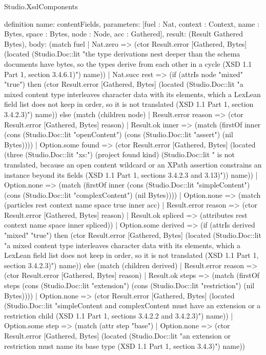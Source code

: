 \begin{lexlean}{Studio.XsdComponents}
\begin{semanticmodule}
definition{
  name: contentFields,
  parameters: [fuel : Nat, context : Context, name : Bytes, space : Bytes, node : Node, acc : Gathered],
  result: (Result Gathered Bytes),
  body: (match fuel
    | Nat.zero => (ctor Result.error [Gathered, Bytes] (located (Studio.Doc::lit "the type derivations nest deeper than the schema documents have bytes, so the types derive from each other in a cycle (XSD 1.1 Part 1, section 3.4.6.1)") name))
    | Nat.succ rest => (if (attrIs node "mixed" "true") then (ctor Result.error [Gathered, Bytes] (located (Studio.Doc::lit "a mixed content type interleaves character data with its elements, which a LexLean field list does not keep in order, so it is not translated (XSD 1.1 Part 1, section 3.4.2.3)") name)) else (match (children node)
      | Result.error reason => (ctor Result.error [Gathered, Bytes] reason)
      | Result.ok inner => (match (firstOf inner (cons (Studio.Doc::lit "openContent") (cons (Studio.Doc::lit "assert") (nil Bytes))))
        | Option.some found => (ctor Result.error [Gathered, Bytes] (located (three (Studio.Doc::lit "xs:") (project found kind) (Studio.Doc::lit " is not translated, because an open content wildcard or an XPath assertion constrains an instance beyond its fields (XSD 1.1 Part 1, sections 3.4.2.3 and 3.13)")) name))
        | Option.none => (match (firstOf inner (cons (Studio.Doc::lit "simpleContent") (cons (Studio.Doc::lit "complexContent") (nil Bytes))))
          | Option.none => (match (particles rest context name space true inner acc)
            | Result.error reason => (ctor Result.error [Gathered, Bytes] reason)
            | Result.ok spliced => (attributes rest context name space inner spliced))
          | Option.some derived => (if (attrIs derived "mixed" "true") then (ctor Result.error [Gathered, Bytes] (located (Studio.Doc::lit "a mixed content type interleaves character data with its elements, which a LexLean field list does not keep in order, so it is not translated (XSD 1.1 Part 1, section 3.4.2.3)") name)) else (match (children derived)
            | Result.error reason => (ctor Result.error [Gathered, Bytes] reason)
            | Result.ok steps => (match (firstOf steps (cons (Studio.Doc::lit "extension") (cons (Studio.Doc::lit "restriction") (nil Bytes))))
              | Option.none => (ctor Result.error [Gathered, Bytes] (located (Studio.Doc::lit "simpleContent and complexContent must have an extension or a restriction child (XSD 1.1 Part 1, sections 3.4.2.2 and 3.4.2.3)") name))
              | Option.some step => (match (attr step "base")
                | Option.none => (ctor Result.error [Gathered, Bytes] (located (Studio.Doc::lit "an extension or restriction must name its base type (XSD 1.1 Part 1, section 3.4.3)") name))
}
\end{semanticmodule}
\end{lexlean}

